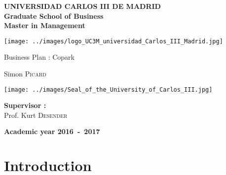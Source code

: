 \documentclass[12pt,a4paper,oneside]{book}
\begin{document}


\begin{titlepage}
\noindent \begin{minipage}{0.83\textwidth}
\noindent \textbf{UNIVERSIDAD CARLOS III DE MADRID}\hfill{}\\
\textbf{Graduate School of Business}\hfill{}\\
\textbf{Master in Management}\hfill{}
\end{minipage}
\begin{minipage}{0.17\textwidth}
\texttt{[image: ../images/logo\_UC3M\_universidad\_Carlos\_III\_Madrid.jpg]}
\end{minipage}
\begin{center}
\vfill{}\vfill{}\vfill{}
{\Huge Business Plan : Copark}
{\Huge \par}
\begin{center}{\LARGE Simon \textsc{Picard}}\end{center}{\Huge \par}
\vfill{}
\texttt{[image: ../images/Seal\_of\_the\_University\_of\_Carlos\_III.jpg]}
\vfill{}
\begin{flushleft}{\large \textbf{Supervisor  :}}\\
{\large Prof. Kurt \textsc{Desender}}
\end{flushleft}{\large\par}
\vfill{}\vfill{}\enlargethispage{2cm}
\textbf{Academic year 2016~-~2017}
\end{center}
\end{titlepage}



\newpage
\thispagestyle{empty} 
\null

\frontmatter

\tableofcontents

\mainmatter

\chapter{Introduction}
\end{document}
